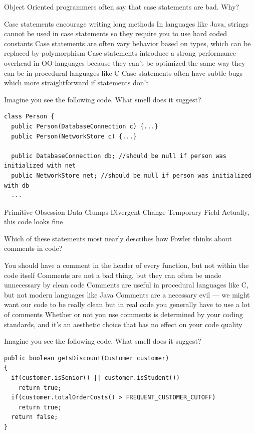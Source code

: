 \documentclass{exam}
\begin{document}
\begin{questions}
\question[1] Object Oriented programmers often say that case statements are bad.  Why?
\begin{choices}
\choice Case statements encourage writing long methods
\choice In languages like Java, strings cannot be used in case statements so they require you to use hard coded constants
\correctchoice Case statements are often vary behavior based on types, which can be replaced by polymorphism
\choice Case statements introduce a strong performance overhead in OO languages because they can't be optimized the same way they can be in procedural languages like C
\choice Case statements often have subtle bugs which more straightforward if statements don't
\end{choices}

\question[1] Imagine you see the following code.  What smell does it suggest?
\begin{lstlisting}
class Person {
  public Person(DatabaseConnection c) {...}
  public Person(NetworkStore c) {...}

  public DatabaseConnection db; //should be null if person was initialized with net
  public NetworkStore net; //should be null if person was initialized with db
  ...
\end{lstlisting}

\begin{choices}
\choice Primitive Obsession
\choice Data Clumps
\choice Divergent Change
\correctchoice Temporary Field
\choice Actually, this code looks fine
\end{choices}

\question[1] Which of these statements most nearly describes how Fowler thinks about comments in code?
\begin{choices}
\choice You should have a comment in the header of every function, but not within the code itself
\correctchoice Comments are not a bad thing, but they can often be made unnecessary by clean code
\choice Comments are useful in procedural languages like C, but not modern languages like Java
\choice Comments are a necessary evil --- we might want our code to be really clean but in real code you generally have to use a lot of comments
\choice Whether or not you use comments is determined by your coding standards, and it's an aesthetic choice that has no effect on your code quality
\end{choices}

\question[1] Imagine you see the following code.  What smell does it suggest?
\begin{lstlisting}
public boolean getsDiscount(Customer customer)
{
  if(customer.isSenior() || customer.isStudent())
    return true;
  if(customer.totalOrderCosts() > FREQUENT_CUSTOMER_CUTOFF)
    return true;
  return false;
}
\end{lstlisting}


\end{questions}
\end{document}

